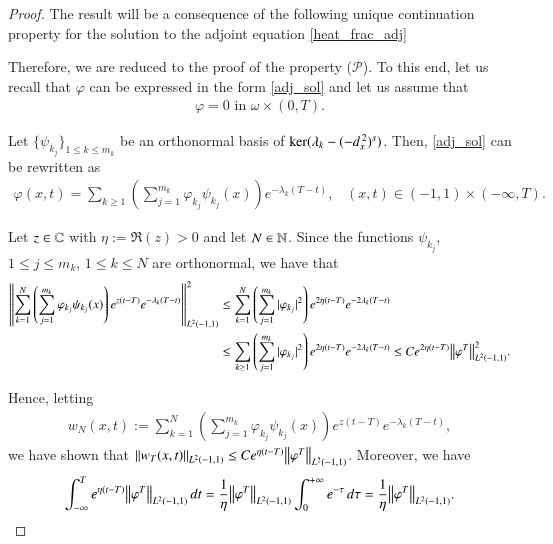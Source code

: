 \begin{proof}

The result will be a consequence of the following unique continuation property for the solution to the adjoint equation \eqref{heat_frac_adj}


Therefore, we are reduced to the proof of the property ($\mathcal P$). To this end, let us recall that $\varphi$ can be expressed in the form \eqref{adj_sol} and let us assume that 
\begin{align}\label{uc}
	\varphi=0 \textrm{ in } \omega\times(0,T). 
\end{align}

Let $\{\psi_{k_j}\}_{1\leq k\leq m_k}$ be an orthonormal basis of $\ker(\lambda_k-(-d_x^{\,2})^{s})$. Then, \eqref{adj_sol} can be rewritten as
\begin{align*}
	\varphi(x,t) = \sum_{k\geq 1} \left(\sum_{j=1}^{m_k} \varphi_{k_j}\psi_{k_j}(x)\right)e^{-\lambda_k(T-t)}, \;\;\; (x,t)\in (-1,1)\times(-\infty, T). 
\end{align*}

Let $z\in\mathbb{C}$ with $\eta:=\Re(z)>0$ and let $N\in\mathbb{N}$. Since the functions $\psi_{k_j}$, $1\leq j\leq m_k$, $1\leq k\leq N$ are orthonormal, we have that
\begin{align*}
	{\left\|\sum_{k=1}^N \left(\sum_{j=1}^{m_k} \varphi_{k_j}\psi_{k_j}(x)\right)e^{z(t-T)}e^{-\lambda_k(T-t)}\right\|}_{L^2(-1,1)}^2 & \leq \sum_{k=1}^N \left(\sum_{j=1}^{m_k} |\varphi_{k_j}|^2\right)e^{2\eta(t-T)}e^{-2\lambda_k(T-t)}
	\\
	& \leq \sum_{k\geq 1} \left(\sum_{j=1}^{m_k} |\varphi_{k_j}|^2\right)e^{2\eta(t-T)}e^{-2\lambda_k(T-t)} \leq Ce^{2\eta(t-T)}{\left\|\varphi^T\right\|}_{L^2(-1,1)}^2.
\end{align*}

Hence, letting 
\begin{align*}
w_N(x,t):= \sum_{k=1}^N \left(\sum_{j=1}^{m_k} \varphi_{k_j}\psi_{k_j}(x)\right)e^{z(t-T)}e^{-\lambda_k(T-t)},
\end{align*}
we have shown that ${\left\|w_T(x,t)\right\|}_{L^2(-1,1)}\leq Ce^{\eta(t-T)}{\left\|\varphi^T\right\|}_{L^2(-1,1)}$. Moreover, we have
\begin{align*}
	\int_{-\infty}^T e^{\eta(t-T)}{\left\|\varphi^T\right\|}_{L^2(-1,1)}\,dt = \frac{1}{\eta}{\left\|\varphi^T\right\|}_{L^2(-1,1)}\int_0^{+\infty} e^{-\tau}\,d\tau = \frac{1}{\eta}{\left\|\varphi^T\right\|}_{L^2(-1,1)}.
\end{align*}


\end{proof}
